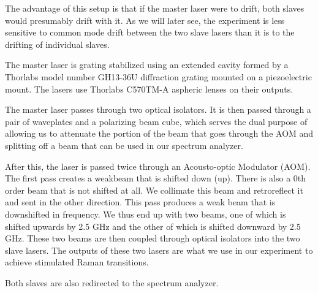 The advantage of this setup is that if the master laser were to drift, both slaves would presumably drift with it. As we will later see, the experiment is less sensitive to common mode drift between the two slave lasers than it is to the drifting of individual slaves.

The master laser is grating stabilized using an extended cavity formed by a Thorlabs model number GH13-36U  %
diffraction grating mounted on a piezoelectric mount. The lasers use Thorlabs C570TM-A aspheric lenses on their outputs. 

The master laser passes through two optical isolators. It is then passed through a pair of waveplates and a polarizing beam cube, which serves the dual purpose of allowing us to attenuate the portion of the beam that goes through the AOM and splitting off a beam that can be used in our spectrum analyzer. 

After this, the laser is passed twice through an Acousto-optic Modulator (AOM). The first pass creates a weakbeam that is shifted down (up). There is also a 0th order beam that is not shifted at all. We collimate this beam and retroreflect it and sent in the other direction. This pass produces a weak beam that is downshifted in frequency. We thus end up with two beams, one of which is shifted upwards by 2.5 GHz and the other of which is shifted downward by 2.5 GHz. These two beams are then coupled through optical isolators into the two slave lasers. The outputs of these two lasers are what we use in our experiment to achieve stimulated Raman transitions. 

Both slaves are also redirected to the spectrum analyzer. 
